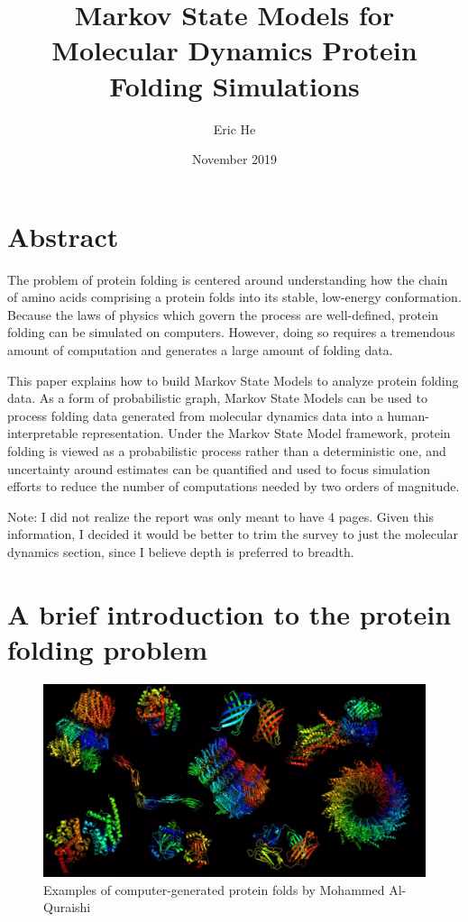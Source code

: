 \documentclass{article}
\title{Markov State Models for Molecular Dynamics Protein Folding Simulations}
\author{Eric He}
\date{November 2019}
\begin{document}
\maketitle

\section*{Abstract}
The problem of protein folding is centered around understanding how the chain of amino acids comprising a protein folds into its stable, low-energy conformation. Because the laws of physics which govern the process are well-defined, protein folding can be simulated on computers. However, doing so requires a tremendous amount of computation and generates a large amount of folding data. 

This paper explains how to build Markov State Models to analyze protein folding data. As a form of probabilistic graph, Markov State Models can be used to process folding data generated from molecular dynamics data into a human-interpretable representation. Under the Markov State Model framework, protein folding is viewed as a probabilistic process rather than a deterministic one, and uncertainty around estimates can be quantified and used to focus simulation efforts to reduce the number of computations needed by two orders of magnitude.

Note: I did not realize the report was only meant to have 4 pages. Given this information, I decided it would be better to trim the survey to just the molecular dynamics section, since I believe depth is preferred to breadth.

\newpage
\tableofcontents
\newpage

\section{A brief introduction to the protein folding problem}

\begin{figure}
  \includegraphics[width=\linewidth]{images/protein_folds.jpg}
  \caption{Examples of computer-generated protein folds by Mohammed Al-Quraishi}
  \label{fig:protein_folds}
\end{figure}
\end{document}
